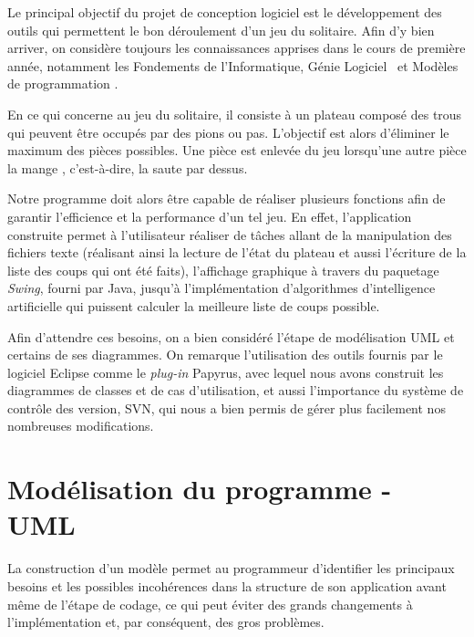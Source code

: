 \documentclass{article}
\begin{document}
Le principal objectif du projet de conception logiciel est le développement
des outils qui permettent le bon déroulement d'un jeu du solitaire. Afin
d'y bien arriver, on considère toujours les connaissances apprises dans le cours
de première année, notamment les \og Fondements de l'Informatique\fg, \og Génie
Logiciel \fg ~et \og Modèles de programmation \fg.

\vspace{12pt}

En ce qui concerne au jeu du solitaire, il consiste à un plateau composé des
trous qui peuvent être occupés par des pions ou pas. L'objectif est alors
d’éliminer le maximum des pièces possibles. Une pièce est enlevée du jeu
lorsqu’une autre pièce la \og mange \fg, c’est-à-dire, la saute par dessus.

\vspace{12pt}

Notre programme doit alors être capable de réaliser plusieurs fonctions afin
de garantir l'efficience et la performance d'un tel jeu. En effet, l'application
construite permet à l'utilisateur réaliser de tâches allant de la manipulation
des fichiers texte (réalisant ainsi la lecture de l’état du plateau et aussi
l’écriture de la liste des coups qui ont été faits), l’affichage graphique à
travers du paquetage \textit{Swing}, fourni par Java, jusqu'à l'implémentation
d'algorithmes d'intelligence artificielle qui puissent calculer la meilleure
liste de coups possible.

\vspace{12pt}

Afin d'attendre ces besoins, on a bien considéré l'étape de modélisation UML et
certains de ses diagrammes. On remarque l'utilisation des outils fournis par le
logiciel Eclipse comme le \textit{plug-in} Papyrus, avec lequel nous avons
construit les diagrammes de classes et de cas d’utilisation, et aussi
l’importance du système de contrôle des version, SVN, qui nous a bien permis de
gérer plus facilement nos nombreuses modifications.


\newpage
\section{Modélisation du programme - UML}

La construction d'un modèle permet au programmeur d'identifier les principaux
besoins et les possibles incohérences dans la structure de son application avant
même de l'étape de codage, ce qui peut éviter des grands changements à
l'implémentation et, par conséquent, des gros problèmes.
\end{document}
